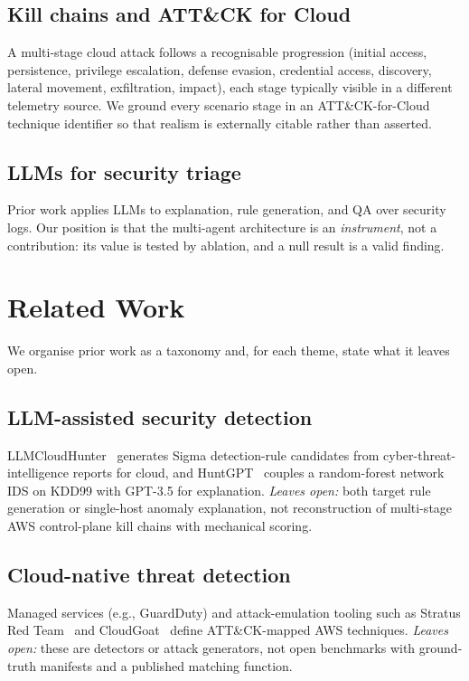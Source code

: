 \documentclass[journal]{IEEEtran}
\begin{document}
\subsection{Kill chains and ATT\&CK for Cloud}
A multi-stage cloud attack follows a recognisable progression (initial access,
persistence, privilege escalation, defense evasion, credential access, discovery,
lateral movement, exfiltration, impact), each stage typically visible in a different
telemetry source. We ground every scenario stage in an ATT\&CK-for-Cloud technique
identifier so that realism is externally citable rather than asserted.

\subsection{LLMs for security triage}
Prior work applies LLMs to explanation, rule generation, and QA over security logs.
Our position is that the multi-agent architecture is an \emph{instrument}, not a
contribution: its value is tested by ablation, and a null result is a valid finding.

\section{Related Work}\label{sec:related}
We organise prior work as a taxonomy and, for each theme, state what it leaves open.

\subsection{LLM-assisted security detection}
LLMCloudHunter~\cite{schwartz2025llmcloudhunter} generates Sigma detection-rule
candidates from cyber-threat-intelligence reports for cloud, and HuntGPT~\cite{ali2023huntgpt}
couples a random-forest network IDS on KDD99 with GPT-3.5 for explanation.
\emph{Leaves open:} both target rule generation or single-host anomaly explanation, not
reconstruction of multi-stage AWS control-plane kill chains with mechanical scoring.

\subsection{Cloud-native threat detection}
Managed services (e.g., GuardDuty) and attack-emulation tooling such as Stratus Red
Team~\cite{stratus} and CloudGoat~\cite{cloudgoat} define ATT\&CK-mapped AWS techniques.
\emph{Leaves open:} these are detectors or attack generators, not open benchmarks with
ground-truth manifests and a published matching function.
\end{document}
